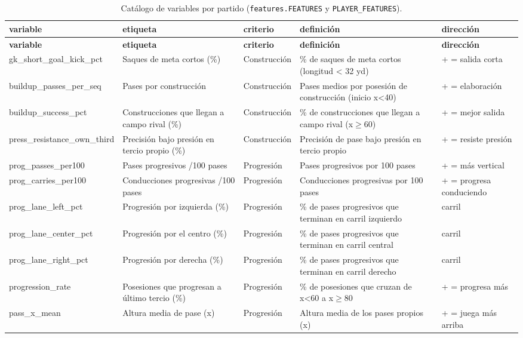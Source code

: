 {\scriptsize
\begin{longtable}{p{3.4cm} p{3.3cm} p{2.2cm} p{5.2cm} p{2.6cm}}
\caption{Catálogo de variables por partido (\texttt{features.FEATURES} y \texttt{PLAYER\_FEATURES}).}\label{tab:catalog}\\
\toprule
\textbf{variable} & \textbf{etiqueta} & \textbf{criterio} & \textbf{definición} & \textbf{dirección} \\
\midrule
\endfirsthead
\toprule
\textbf{variable} & \textbf{etiqueta} & \textbf{criterio} & \textbf{definición} & \textbf{dirección} \\
\midrule
\endhead
\bottomrule
\endfoot
gk\_short\_goal\_kick\_pct & Saques de meta cortos (\%) & Construcción & \% de saques de meta cortos (longitud < 32 yd) & + = salida corta \\
buildup\_passes\_per\_seq & Pases por construcción & Construcción & Pases medios por posesión de construcción (inicio x<40) & + = elaboración \\
buildup\_success\_pct & Construcciones que llegan a campo rival (\%) & Construcción & \% de construcciones que llegan a campo rival (x$\geq$60) & + = mejor salida \\
press\_resistance\_own\_third & Precisión bajo presión en tercio propio (\%) & Construcción & Precisión de pase bajo presión en tercio propio & + = resiste presión \\
prog\_passes\_per100 & Pases progresivos /100 pases & Progresión & Pases progresivos por 100 pases & + = más vertical \\
prog\_carries\_per100 & Conducciones progresivas /100 pases & Progresión & Conducciones progresivas por 100 pases & + = progresa conduciendo \\
prog\_lane\_left\_pct & Progresión por izquierda (\%) & Progresión & \% de pases progresivos que terminan en carril izquierdo & carril \\
prog\_lane\_center\_pct & Progresión por el centro (\%) & Progresión & \% de pases progresivos que terminan en carril central & carril \\
prog\_lane\_right\_pct & Progresión por derecha (\%) & Progresión & \% de pases progresivos que terminan en carril derecho & carril \\
progression\_rate & Posesiones que progresan a último tercio (\%) & Progresión & \% de posesiones que cruzan de x<60 a x$\geq$80 & + = progresa más \\
pass\_x\_mean & Altura media de pase (x) & Progresión & Altura media de los pases propios (x) & + = juega más arriba \\

\end{longtable}}
